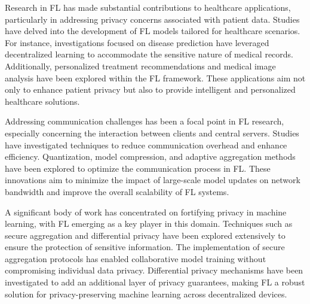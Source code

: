 \documentclass[conference]{IEEEtran}
\begin{document}

Research in FL has made substantial contributions to healthcare applications, particularly in addressing privacy concerns associated with patient data. Studies have delved into the development of FL models tailored for healthcare scenarios. For instance, investigations focused on disease prediction have leveraged decentralized learning to accommodate the sensitive nature of medical records.\cite{5} Additionally, personalized treatment recommendations and medical image analysis have been explored within the FL framework. These applications aim not only to enhance patient privacy but also to provide intelligent and personalized healthcare solutions.


Addressing communication challenges has been a focal point in FL research, especially concerning the interaction between clients and central servers. Studies have investigated techniques to reduce communication\cite{6} overhead and enhance efficiency. Quantization, model compression, and adaptive aggregation methods have been explored to optimize the communication process in FL. These innovations aim to minimize the impact of large-scale model updates on network bandwidth and improve the overall scalability of FL systems.


A significant body of work has concentrated on fortifying privacy\cite{7} in machine learning, with FL emerging as a key player in this domain. Techniques such as secure aggregation and differential privacy have been explored extensively to ensure the protection of sensitive information. The implementation of secure aggregation protocols has enabled collaborative model training without compromising individual data privacy. Differential privacy mechanisms have been investigated to add an additional layer of privacy guarantees, making FL a robust solution for privacy-preserving machine learning across decentralized devices.
\end{document}
